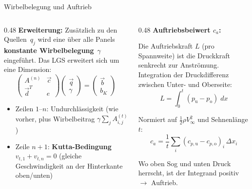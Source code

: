 \documentclass[aspectratio=169]{beamer}
\begin{document}
\begin{frame}{Wirbelbelegung und Auftrieb}
\footnotesize

\begin{columns}[T]
\begin{column}{0.48\textwidth}
\textbf{Erweiterung:} Zusätzlich zu den Quellen~$q_j$ wird
eine über alle Panels \textbf{konstante Wirbelbelegung}~$\gamma$
eingeführt. Das LGS erweitert sich um eine Dimension:
\vspace{-1mm}
\[
  \begin{pmatrix} A^{(n)} & \vec{c} \\ \vec{d}^T & e \end{pmatrix}
  \begin{pmatrix} \vec{q} \\ \gamma \end{pmatrix}
  = \begin{pmatrix} \vec{b} \\ b_K \end{pmatrix}
\]

\vspace{-2mm}
\begin{itemize}\setlength\itemsep{1pt}
  \item Zeilen $1$--$n$: Undurchlässigkeit (wie vorher,
        plus Wirbelbeitrag $\gamma\sum_j A^{(t)}_{i,j}$)
  \item Zeile $n\!+\!1$: \textbf{Kutta-Bedingung}\\
        $v_{t,1}+v_{t,n}=0$ (gleiche Geschwindigkeit
        an der Hinterkante oben/unten)
\end{itemize}
\end{column}
\begin{column}{0.48\textwidth}
\textbf{Auftriebsbeiwert $c_a$:}

\smallskip
Die Auftriebskraft $L$ (pro Spannweite) ist die
Druckkraft senkrecht zur Anströmung. Integration
der Druckdifferenz zwischen Unter- und Oberseite:
\vspace{-1mm}
\[
  L = \int_0^t\!(p_{\text{u}} - p_{\text{o}})\;dx
\]

\vspace{-3mm}
Normiert auf $\tfrac{1}{2}\rho V_\infty^2$ und Sehnenlänge $t$:
\vspace{-1mm}
\[
  \boxed{c_a = \frac{1}{t}\sum_i
  (c_{p,\text{u}} - c_{p,\text{o}})_i\,\Delta x_i}
\]

\vspace{-2mm}
Wo oben Sog und unten Druck herrscht,
ist der Integrand positiv $\to$ Auftrieb.
\end{column}
\end{columns}

\end{frame}
\end{document}
